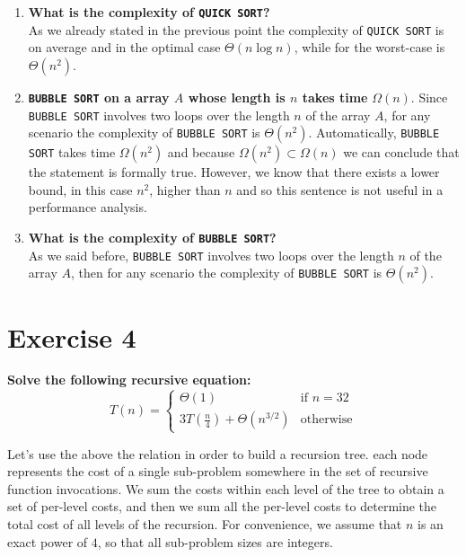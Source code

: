 \documentclass{article}
\begin{document}
\begin{enumerate}[label=(\alph*)]
		\item \textbf{What is the complexity of \texttt{QUICK SORT}?}\\
		As we already stated in the previous point the complexity of \texttt{QUICK SORT} is on average and in the optimal case $\Theta(n\log n)$, while for the worst-case is $\Theta(n^2)$.
		\item \textbf{\texttt{BUBBLE SORT} on a array $A$ whose length is $n$ takes time} $\Omega(n)$.
		Since \texttt{BUBBLE SORT} involves two loops over the length $n$ of the array $A$, for any scenario the complexity of \texttt{BUBBLE SORT} is $\Theta(n^2)$. Automatically, \texttt{BUBBLE SORT} takes time $\Omega(n^2)$ and because $\Omega(n^2) \subset \Omega(n) $ we can conclude that the statement is formally true. However, we know that there exists a lower bound, in this case $n^2$, higher than $n$ and so this sentence is not useful in a performance analysis. 
		\item  \textbf{What is the complexity of \texttt{BUBBLE SORT}?} \\
		As we said before,  \texttt{BUBBLE SORT} involves two loops over the length $n$ of the array $A$, then for any scenario the complexity of \texttt{BUBBLE SORT} is $\Theta(n^2)$. 
	\end{enumerate}

	\section*{Exercise 4}
	\textbf{Solve the following recursive equation:}
	$$
	T(n) = \begin{cases}
			\Theta(1) & \text{if } n= 32 \\
			3T(\frac{n}{4}) + \Theta(n^{3/2}) & \text{otherwise}
			\end{cases} 
	$$
	
	\noindent Let's use the above the relation in order to build a recursion tree.  each node represents the cost of a single sub-problem somewhere in the set of recursive function invocations. We sum the costs within each level of the tree to obtain a set of per-level costs, and then we sum all the per-level costs to determine the total cost of all levels of the recursion. For convenience, we assume that $n$ is an exact power of $4$, so that all sub-problem sizes are integers. \\
	
\end{document}

